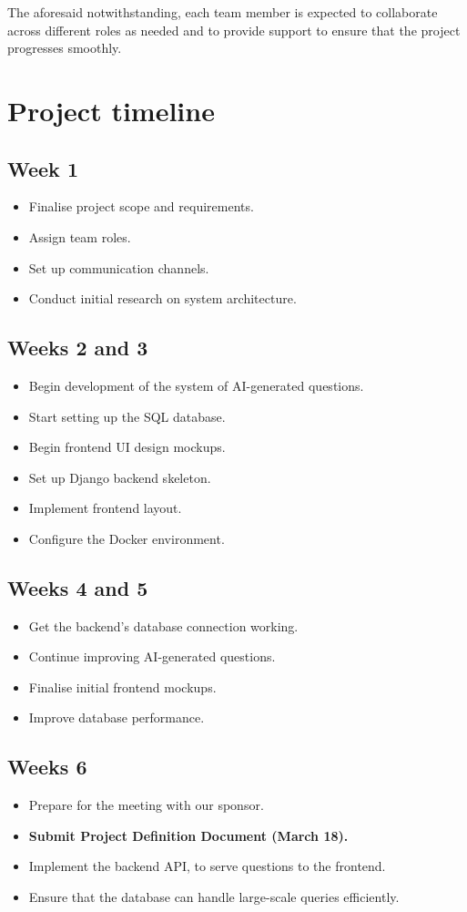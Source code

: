 \documentclass{scrartcl}
\begin{document}
The aforesaid notwithstanding, each team member is expected to collaborate across different roles as needed and to provide support to ensure that the project progresses smoothly.

\section{Project timeline}
\subsection{Week 1}
\begin{itemize}
\item Finalise project scope and requirements.
\item Assign team roles.
\item Set up communication channels.
\item Conduct initial research on system architecture.
\end{itemize}

\subsection{Weeks 2 and 3}
\begin{itemize}
\item Begin development of the system of AI-generated questions.
\item Start setting up the SQL database.
\item Begin frontend UI design mockups.
\item Set up Django backend skeleton.
\item Implement frontend layout.
\item Configure the Docker \parencite{docker} environment.
\end{itemize}

\subsection{Weeks 4 and 5}
\begin{itemize}
\item Get the backend's database connection working.
\item Continue improving AI-generated questions.
\item Finalise initial frontend mockups.
\item Improve database performance.
\end{itemize}

\subsection{Weeks 6}
\begin{itemize}
\item Prepare for the meeting with our sponsor.
\item \textbf{Submit Project Definition Document (March 18).}
\item Implement the backend API, to serve questions to the frontend.
\item Ensure that the database can handle large-scale queries efficiently.
\end{itemize}
\end{document}
